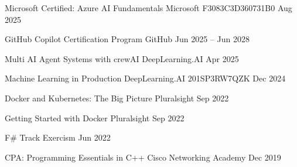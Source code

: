 

\begin{cvhonors}[3.4cm]

  \cvhonor
    {Microsoft Certified: Azure AI Fundamentals} %
    {Microsoft} %
    {F3083C3D360731B0} %
    {Aug 2025} %

  \cvhonor
    {GitHub Copilot Certification Program} %
    {GitHub} %
    {} %
    {Jun 2025 – Jun 2028} %

\end{cvhonors}


\begin{cvhonors}

  \cvhonor
    {Multi AI Agent Systems with crewAI} %
    {DeepLearning.AI} %
    {} %
    {Apr 2025} %

  \cvhonor
    {Machine Learning in Production} %
    {DeepLearning.AI} %
    {201SP3RW7QZK} %
    {Dec 2024} %

  \cvhonor
    {Docker and Kubernetes: The Big Picture} %
    {Pluralsight} %
    {} %
    {Sep 2022} %

  \cvhonor
    {Getting Started with Docker} %
    {Pluralsight} %
    {} %
    {Sep 2022} %

  \cvhonor
    {F\# Track} %
    {Exercism} %
    {} %
    {Jun 2022} %

  \cvhonor
    {CPA: Programming Essentials in C++} %
    {Cisco Networking Academy} %
    {} %
    {Dec 2019} %

\end{cvhonors}
